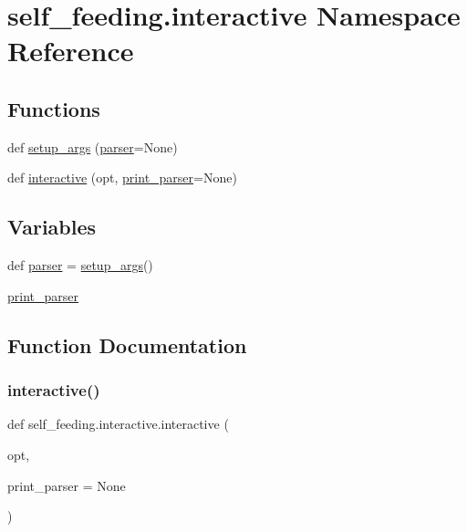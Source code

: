 \hypertarget{namespaceself__feeding_1_1interactive}{}\section{self\+\_\+feeding.\+interactive Namespace Reference}
\label{namespaceself__feeding_1_1interactive}
\subsection*{Functions}
\begin{DoxyCompactItemize}
\item 
def \hyperlink{namespaceself__feeding_1_1interactive_a41738b6079e2f4bfb331d7794d39ada4}{setup\+\_\+args} (\hyperlink{namespaceself__feeding_1_1interactive_ace08baaac08a08519c4635b297b4612a}{parser}=None)
\item 
def \hyperlink{namespaceself__feeding_1_1interactive_ab6a36a59956d8f1381be1f0bf62dbb32}{interactive} (opt, \hyperlink{namespaceself__feeding_1_1interactive_afee768db90c5161fb770f7c74eec8ed0}{print\+\_\+parser}=None)
\end{DoxyCompactItemize}
\subsection*{Variables}
\begin{DoxyCompactItemize}
\item 
def \hyperlink{namespaceself__feeding_1_1interactive_ace08baaac08a08519c4635b297b4612a}{parser} = \hyperlink{namespaceself__feeding_1_1interactive_a41738b6079e2f4bfb331d7794d39ada4}{setup\+\_\+args}()
\item 
\hyperlink{namespaceself__feeding_1_1interactive_afee768db90c5161fb770f7c74eec8ed0}{print\+\_\+parser}
\end{DoxyCompactItemize}


\subsection{Function Documentation}
\mbox{\label{namespaceself__feeding_1_1interactive_ab6a36a59956d8f1381be1f0bf62dbb32}} 
\subsubsection{\texorpdfstring{interactive()}{interactive()}}
{\footnotesize\ttfamily def self\+\_\+feeding.\+interactive.\+interactive (\begin{DoxyParamCaption}\item[{}]{opt,  }\item[{}]{print\+\_\+parser = {\ttfamily None} }\end{DoxyParamCaption})}



